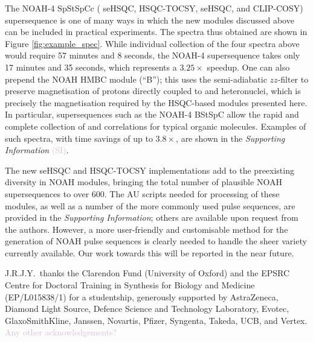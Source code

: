\documentclass[11pt]{article}
\newcommand*{\carbon}{\ce{^{13}C}}
\newcommand*{\nitrogen}{\ce{^{15}N}}
\newcommand*{\hl}[1]{\textcolor{Thistle}{#1}}
\newcommand*{\figref}[1]{Figure \ref{fig:#1}}
\newcommand*{\SInf}{\textit{Supporting Information}}
\newcommand*{\sitodo}{\hl{(SI)}}
\begin{document}
The NOAH-4 SpStSpCc (\nitrogen{} seHSQC, \carbon{} HSQC-TOCSY, \carbon{} seHSQC, and CLIP-COSY) supersequence is one of many ways in which the new modules discussed above can be included in practical experiments.
The spectra thus obtained are shown in \figref{example_spec}.
While individual collection of the four spectra above would require 57 minutes and 8 seconds, the NOAH-4 supersequence takes only 17 minutes and 35 seconds, which represents a $3.25\times$ speedup.
One can also prepend the NOAH HMBC module (``B'');\autocite{Kupce2019JMR} this uses the semi-adiabatic $zz$-filter to preserve magnetisation of protons directly coupled to \carbon{} and \nitrogen{} heteronuclei, which is precisely the magnetisation required by the HSQC-based modules presented here.
In particular, supersequences such as the NOAH-4 BStSpC allow the rapid and complete collection of  and  correlations for typical organic molecules.
Examples of such spectra, with time savings of up to $3.8\times$, are shown in the \SInf{} \sitodo{}.


The new seHSQC and HSQC-TOCSY implementations add to the preexisting diversity in NOAH modules, bringing the total number of plausible NOAH supersequences to over 600.
The AU scripts needed for processing of these modules, as well as a number of the more commonly used pulse sequences, are provided in the \SInf{}; others are available upon request from the authors.
However, a more user-friendly and customisable method for the generation of NOAH pulse sequences is clearly needed to handle the sheer variety currently available.
Our work towards this will be reported in the near future.



J.R.J.Y.\ thanks the Clarendon Fund (University of Oxford) and the EPSRC Centre for Doctoral Training in Synthesis for Biology and Medicine (EP/L015838/1) for a studentship, generously supported by AstraZeneca, Diamond Light Source, Defence Science and Technology Laboratory, Evotec, GlaxoSmithKline, Janssen, Novartis, Pfizer, Syngenta, Takeda, UCB, and Vertex.
\hl{Any other acknowledgements?}

\printbibliography

\end{document}
